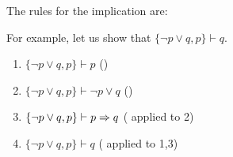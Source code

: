The rules for the implication are:

\begin{prooftree}
\end{prooftree}

\begin{prooftree}
\end{prooftree}

\begin{prooftree}
\end{prooftree}

\begin{prooftree}
\end{prooftree}

For example, let us show that $\{\neg p\vee q,p\}\vdash q$.
\begin{enumerate}
	\item $\{\neg p\vee q, p\}\vdash p$ \hfill ()
	\item $\{\neg p\vee q, p\}\vdash \neg p\vee q$ \hfill ()
	\item $\{\neg p\vee q, p\}\vdash p\imp q$ \hfill ( applied to 2)
	\item $\{\neg p\vee q, p\}\vdash q$ \hfill ( applied to 1,3)
\end{enumerate}

